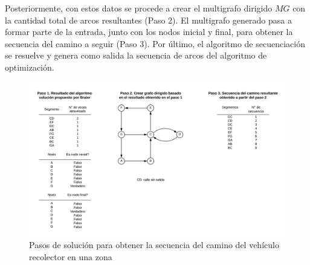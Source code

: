 Posteriormente, con estos datos se procede a crear el multigrafo dirigido $MG$ con la cantidad total de arcos resultantes (Paso 2). El multigrafo generado pasa a formar parte de la entrada, junto con los nodos inicial y final, para obtener la secuencia del camino a seguir (Paso 3). Por último, el algoritmo de secuenciación se resuelve y genera como salida la secuencia de arcos del algoritmo de optimización.

\begin{figure}[tb]
\centerline{\includegraphics[width=\textwidth]{pasos_de_solucion.png}}
\caption{Pasos de solución para obtener la secuencia del camino del vehículo recolector en una zona}
\label{fig:PasosSolucion}
\end{figure}


